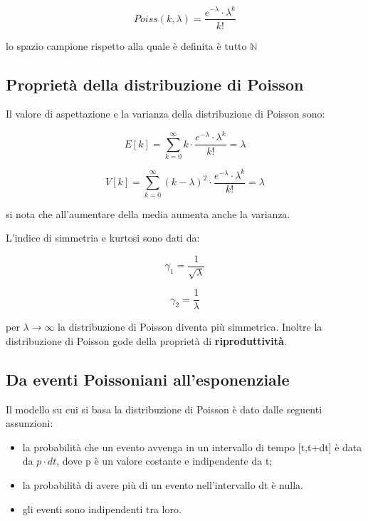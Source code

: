 \documentclass[11pt,a4paper]{book}
\begin{document}
\begin{equation}
	Poiss(k,\lambda) = \dfrac{e^{-\lambda} \cdot \lambda^k}{k!}
\end{equation}

lo spazio campione rispetto alla quale \`{e} definita \`{e} tutto $\mathbb{N}$



\subsection{Propriet\`{a} della distribuzione di Poisson}

Il valore di aspettazione e la varianza della distribuzione di Poisson sono:

\begin{equation}
	E[k] = \sum_{k=0}^{\infty}k \cdot \dfrac{e^{-\lambda} \cdot \lambda^k}{k!} = \lambda 
\end{equation}

\begin{equation}
	V[k] = \sum_{k=0}^{\infty} (k - \lambda)^2 \cdot \dfrac{e^{-\lambda} \cdot \lambda^k}{k!} = \lambda 
\end{equation}

si nota che all'aumentare della media aumenta anche la varianza. \newline

L'indice di simmetria e kurtosi sono dati da:

\begin{equation}
	\gamma_1 = \dfrac{1}{\sqrt{\lambda}}
\end{equation}

\begin{equation}
	\gamma_2 = \frac{1}{\lambda}
\end{equation}

per $\lambda \rightarrow \infty $ la distribuzione di Poisson diventa pi\`{u} simmetrica. Inoltre la distribuzione di Poisson gode della propriet\`{a} di \textbf{riproduttivit\`{a}}.


\subsection{Da eventi Poissoniani all'esponenziale}

Il modello su cui si basa la distribuzione di Poisson \`{e} dato dalle seguenti assunzioni:

\begin{itemize}
	\item la probabilit\`{a} che un evento avvenga in un intervallo di tempo [t,t+dt] \`{e} data da $p\cdot dt$, dove p \`{e} un valore costante e indipendente da t;
	\item la probabilit\`{a} di avere pi\`{u} di un evento nell'intervallo dt \`{e} nulla.
	\item gli eventi sono indipendenti tra loro.
\end{itemize}
\end{document}
